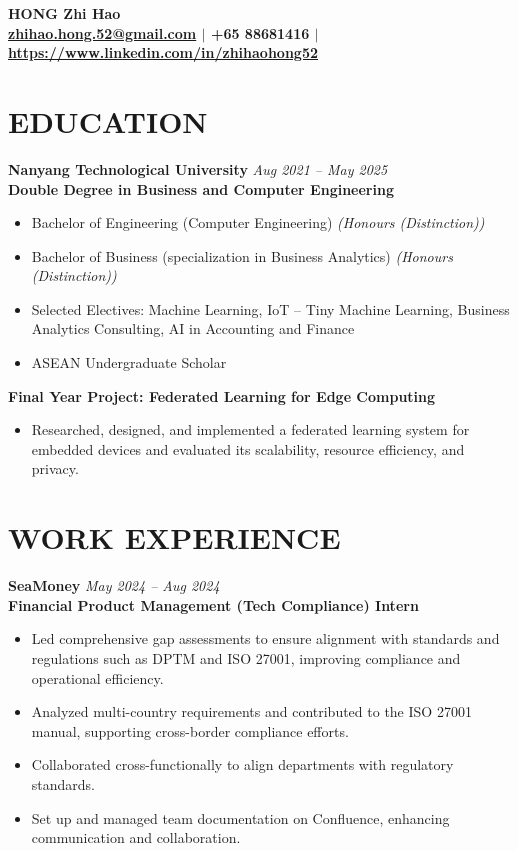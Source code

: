 \documentclass[a4paper,10pt]{article}
\newcommand{\resumeHeading}[4]{%
  \vspace{3pt}
  \textbf{#1} \hfill \textit{#2} \\
  \textbf{#3} \hfill \textit{#4}
  \vspace{1pt}
}
\newcommand{\resumeSubheading}[2]{%
  \vspace{1pt}
  \textbf{#1} \hfill #2
  \vspace{1pt}
}
\begin{document}
\begin{center}
  {\Large \textbf{HONG Zhi Hao}} \\[2pt]
  \textbf{\href{mailto:zhihao.hong.52@gmail.com}{zhihao.hong.52@gmail.com} $|$ +65 88681416 $|$ \href{https://www.linkedin.com/in/zhihaohong52}{https://www.linkedin.com/in/zhihaohong52}}
\end{center}

\section{EDUCATION}

\resumeHeading{Nanyang Technological University}{Aug 2021 -- May 2025}{Double Degree in Business and Computer Engineering}{}
\begin{itemize}
  \item Bachelor of Engineering (Computer Engineering) \textit{(Honours (Distinction))}
  \item Bachelor of Business (specialization in Business Analytics) \textit{(Honours (Distinction))}
  \item Selected Electives: Machine Learning, IoT -- Tiny Machine Learning, Business Analytics Consulting, AI in Accounting and Finance
  \item ASEAN Undergraduate Scholar
\end{itemize}

\resumeSubheading{Final Year Project: Federated Learning for Edge Computing}{}
\begin{itemize}
  \item Researched, designed, and implemented a federated learning system for embedded devices and evaluated its scalability, resource efficiency, and privacy.
\end{itemize}

\section{WORK EXPERIENCE}

\resumeHeading{SeaMoney}{May 2024 -- Aug 2024}{Financial Product Management (Tech Compliance) Intern}{}
\begin{itemize}
  \item Led comprehensive gap assessments to ensure alignment with standards and regulations such as DPTM and ISO 27001, improving compliance and operational efficiency.
  \item Analyzed multi-country requirements and contributed to the ISO 27001 manual, supporting cross-border compliance efforts.
  \item Collaborated cross-functionally to align departments with regulatory standards.
  \item Set up and managed team documentation on Confluence, enhancing communication and collaboration.
\end{itemize}
\end{document}
